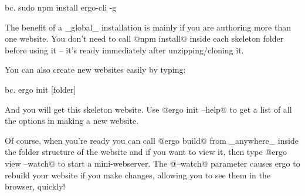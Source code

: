 bc. sudo npm install ergo-cli -g

The benefit of a _global_ installation is mainly if you are authoring more than one website. You don't need to call @npm install@ inside each skeleton folder before using it -- it's ready immediately after unzipping/cloning it.

You can also create new websites easily by typing:

bc. ergo init [folder]

And you will get this skeleton website. Use @ergo init --help@ to get a list of all the options in making a new website.

Of course, when you're ready you can call @ergo build@ from _anywhere_ inside the folder structure of the website and if you want to view it, then type @ergo view --watch@ to start a mini-webserver. The @--watch@ parameter causes ergo to rebuild your website if you make changes, allowing you to see them in the browser, quickly!





